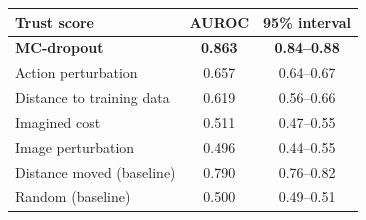 \begin{tabular}{@{}lcc@{}}
\toprule
Trust score & AUROC & 95\% interval \\
\midrule
\textbf{MC-dropout} & \textbf{0.863} & \textbf{0.84--0.88} \\
Action perturbation & 0.657 & 0.64--0.67 \\
Distance to training data & 0.619 & 0.56--0.66 \\
Imagined cost & 0.511 & 0.47--0.55 \\
Image perturbation & 0.496 & 0.44--0.55 \\
\midrule
Distance moved (baseline) & 0.790 & 0.76--0.82 \\
Random (baseline) & 0.500 & 0.49--0.51 \\
\bottomrule
\end{tabular}
